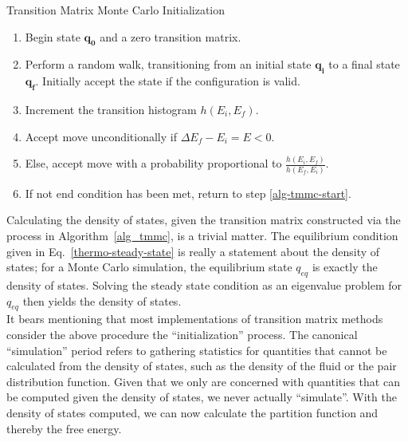 \documentclass[12pt]{article}
\begin{document}
\begin{algorithm}[tb]
    \caption{Transition Matrix Monte Carlo Initialization}
    \label{alg_tmmc}
    \hrulefill
    \begin{enumerate}
        \item Begin state $\mathbf{q_0}$ and a zero transition matrix.
        \item Perform a random walk, transitioning from an initial state $\mathbf{q_i}$ to a final state $\mathbf{q_{f}}$. Initially accept the state if the configuration is valid. \label{alg-tmmc-start}
        \item Increment the transition histogram $h(E_i, E_f)$.
        \item Accept move unconditionally if $\Delta E_f - E_i = E < 0$.
        \item Else, accept move with a probability proportional to $\frac{h(E_i, E_f )}{h(E_f, E_i)}$.
        \item If not end condition has been met, return to step \ref{alg-tmmc-start}.   
    \end{enumerate}
    \hrulefill
\end{algorithm}

Calculating the density of states, given the transition matrix constructed via the process in Algorithm~\ref{alg_tmmc}, is a trivial matter. The equilibrium condition given in Eq.~\ref{thermo-steady-state} is really a statement about the density of states; for a Monte Carlo simulation, the equilibrium state $q_{eq}$ is exactly the density of states. Solving the steady state condition as an eigenvalue problem for $q_{eq}$ then yields the density of states\cite{perlinthesis}. \\

It bears mentioning that most implementations of transition matrix methods consider the above procedure the ``initialization'' process. The canonical ``simulation'' period refers to gathering statistics for quantities that cannot be calculated from the density of states, such as the density of the fluid or the pair distribution function. Given that we only are concerned with quantities that can be computed given the density of states, we never actually ``simulate''. With the density of states computed, we can now calculate the partition function and thereby the free energy.
\end{document}
